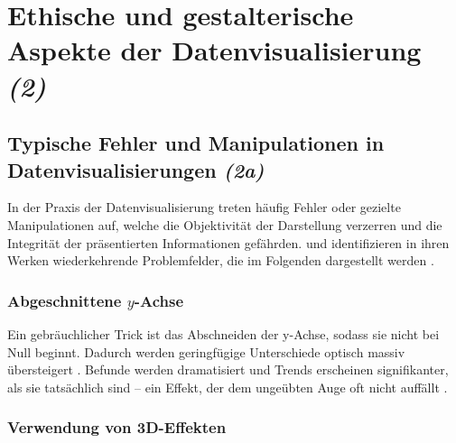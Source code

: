 

\section{Ethische und gestalterische Aspekte der Datenvisualisierung \textit{(2)}}


\subsection{Typische Fehler und Manipulationen in Datenvisualisierungen \textit{(2a)}}
\label{sec:2a}

In der Praxis der Datenvisualisierung treten häufig Fehler oder gezielte Manipulationen auf, welche die Objektivität der Darstellung verzerren und die Integrität der präsentierten Informationen gefährden. \citeauthor{1} und \citeauthor{2} identifizieren in ihren Werken wiederkehrende Problemfelder, die im Folgenden dargestellt werden \cite[50]{1}\cite[31]{2}.

\subsubsection{Abgeschnittene \texorpdfstring{\(y\)-Achse}{y-Achse}}

Ein gebräuchlicher Trick ist das Abschneiden der y-Achse, sodass sie nicht bei Null beginnt. Dadurch werden geringfügige Unterschiede optisch massiv übersteigert \cite[50, 51]{1}. Befunde werden dramatisiert und Trends erscheinen signifikanter, als sie tatsächlich sind – ein Effekt, der dem ungeübten Auge oft nicht auffällt \cite[55]{2}.

\subsubsection{Verwendung von 3D-Effekten}


